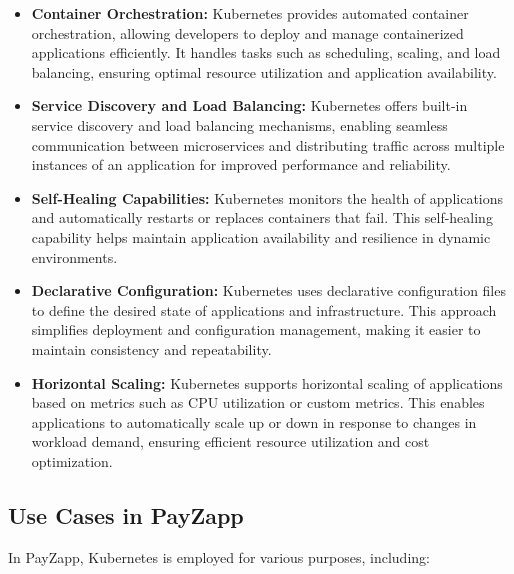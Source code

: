 \documentclass[12pt,a4paper]{report}
\begin{document}
\begin{itemize}
    \item \textbf{Container Orchestration:} Kubernetes provides automated container orchestration, allowing developers to deploy and manage containerized applications efficiently. It handles tasks such as scheduling, scaling, and load balancing, ensuring optimal resource utilization and application availability.
    
    \item \textbf{Service Discovery and Load Balancing:} Kubernetes offers built-in service discovery and load balancing mechanisms, enabling seamless communication between microservices and distributing traffic across multiple instances of an application for improved performance and reliability.
    
    \item \textbf{Self-Healing Capabilities:} Kubernetes monitors the health of applications and automatically restarts or replaces containers that fail. This self-healing capability helps maintain application availability and resilience in dynamic environments.
    
    \item \textbf{Declarative Configuration:} Kubernetes uses declarative configuration files to define the desired state of applications and infrastructure. This approach simplifies deployment and configuration management, making it easier to maintain consistency and repeatability.
    
    \item \textbf{Horizontal Scaling:} Kubernetes supports horizontal scaling of applications based on metrics such as CPU utilization or custom metrics. This enables applications to automatically scale up or down in response to changes in workload demand, ensuring efficient resource utilization and cost optimization.
\end{itemize}

\subsection{Use Cases in PayZapp}

In PayZapp, Kubernetes is employed for various purposes, including:
\end{document}
